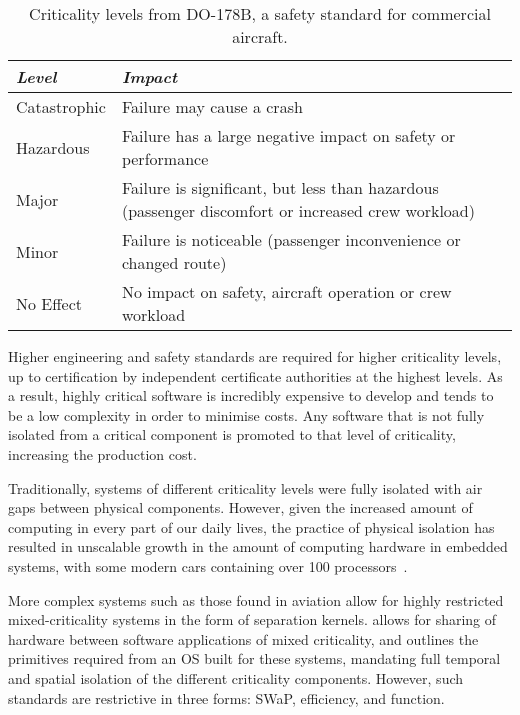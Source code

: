 \begin{table}
     \centering
     \begin{tabular}{ l p{10cm}} \toprule
         \emph{Level}   & \emph{Impact} \\ \midrule
         Catastrophic   & Failure may cause a crash \\
         Hazardous      & Failure has a large negative impact on safety or performance \\
         Major          & Failure is significant, but less than hazardous
                                (passenger discomfort or increased crew workload) \\
         Minor          & Failure is noticeable (passenger inconvenience or changed route) \\
         No Effect      & No impact on safety, aircraft operation or crew workload \\
         \bottomrule
     \end{tabular}
     \caption{Criticality levels from DO-178B, a safety standard for commercial aircraft.}
     \label{tab:critable}
 \end{table}

Higher engineering and safety standards are required for higher criticality levels, up to
certification by independent certificate authorities at the highest levels. As a result, highly
critical software is incredibly expensive to develop and tends to be a low complexity in order to
minimise costs. Any software that is not fully isolated from a critical component is promoted to
that level of criticality, increasing the production cost.

Traditionally, systems of different criticality levels were fully isolated with
air gaps between physical components. However, given the increased amount of
computing in every part of our daily lives, the practice of physical isolation
has resulted in unscalable growth in the amount of computing hardware in
embedded systems, with some modern cars containing over 100
processors~\citep{Hergenhan_Heiser_08}. 

More complex systems such as those found in aviation allow for highly
restricted mixed-criticality systems in the form of separation kernels.
\citet{ARINC653} allows for sharing of hardware between software applications
of mixed criticality, and outlines the primitives required from an \gls{OS}
built for these systems, mandating full temporal and spatial isolation of the
different criticality components. However, such standards are restrictive in three forms:
\gls{SWaP}, efficiency, and function.

